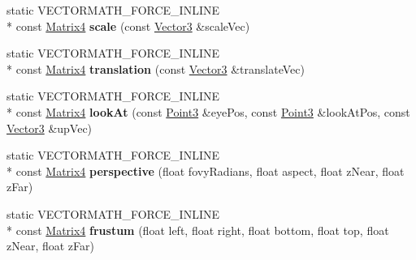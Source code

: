 \begin{DoxyCompactItemize}
\item 
\hypertarget{class_vectormath_1_1_aos_1_1_matrix4_a90f7ba57a31c662b516bdb013306866b}{static V\+E\+C\+T\+O\+R\+M\+A\+T\+H\+\_\+\+F\+O\+R\+C\+E\+\_\+\+I\+N\+L\+I\+N\+E \\*
const \hyperlink{class_vectormath_1_1_aos_1_1_matrix4}{Matrix4} {\bfseries scale} (const \hyperlink{class_vectormath_1_1_aos_1_1_vector3}{Vector3} \&scale\+Vec)}\label{class_vectormath_1_1_aos_1_1_matrix4_a90f7ba57a31c662b516bdb013306866b}

\item 
\hypertarget{class_vectormath_1_1_aos_1_1_matrix4_ae8eb0b5856de781d6a28aba7f7237b4a}{static V\+E\+C\+T\+O\+R\+M\+A\+T\+H\+\_\+\+F\+O\+R\+C\+E\+\_\+\+I\+N\+L\+I\+N\+E \\*
const \hyperlink{class_vectormath_1_1_aos_1_1_matrix4}{Matrix4} {\bfseries translation} (const \hyperlink{class_vectormath_1_1_aos_1_1_vector3}{Vector3} \&translate\+Vec)}\label{class_vectormath_1_1_aos_1_1_matrix4_ae8eb0b5856de781d6a28aba7f7237b4a}

\item 
\hypertarget{class_vectormath_1_1_aos_1_1_matrix4_a2b66c9f91bd1e3a655091421379e5ec1}{static V\+E\+C\+T\+O\+R\+M\+A\+T\+H\+\_\+\+F\+O\+R\+C\+E\+\_\+\+I\+N\+L\+I\+N\+E \\*
const \hyperlink{class_vectormath_1_1_aos_1_1_matrix4}{Matrix4} {\bfseries look\+At} (const \hyperlink{class_vectormath_1_1_aos_1_1_point3}{Point3} \&eye\+Pos, const \hyperlink{class_vectormath_1_1_aos_1_1_point3}{Point3} \&look\+At\+Pos, const \hyperlink{class_vectormath_1_1_aos_1_1_vector3}{Vector3} \&up\+Vec)}\label{class_vectormath_1_1_aos_1_1_matrix4_a2b66c9f91bd1e3a655091421379e5ec1}

\item 
\hypertarget{class_vectormath_1_1_aos_1_1_matrix4_af3c44b61e15c2083ec76d184bcfcf74a}{static V\+E\+C\+T\+O\+R\+M\+A\+T\+H\+\_\+\+F\+O\+R\+C\+E\+\_\+\+I\+N\+L\+I\+N\+E \\*
const \hyperlink{class_vectormath_1_1_aos_1_1_matrix4}{Matrix4} {\bfseries perspective} (float fovy\+Radians, float aspect, float z\+Near, float z\+Far)}\label{class_vectormath_1_1_aos_1_1_matrix4_af3c44b61e15c2083ec76d184bcfcf74a}

\item 
\hypertarget{class_vectormath_1_1_aos_1_1_matrix4_ad45a9a98ae24f8f500567cb498445ca4}{static V\+E\+C\+T\+O\+R\+M\+A\+T\+H\+\_\+\+F\+O\+R\+C\+E\+\_\+\+I\+N\+L\+I\+N\+E \\*
const \hyperlink{class_vectormath_1_1_aos_1_1_matrix4}{Matrix4} {\bfseries frustum} (float left, float right, float bottom, float top, float z\+Near, float z\+Far)}\label{class_vectormath_1_1_aos_1_1_matrix4_ad45a9a98ae24f8f500567cb498445ca4}


\end{DoxyCompactItemize}

